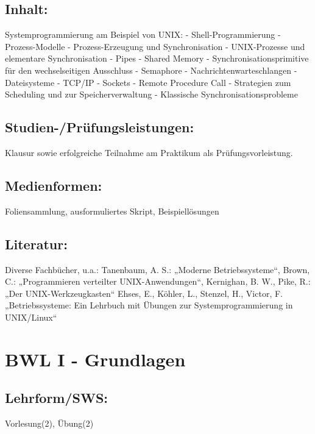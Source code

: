 \section{Inhalt:}\label{inhalt-5}

Systemprogrammierung am Beispiel von UNIX: - Shell-Programmierung -
Prozess-Modelle - Prozess-Erzeugung und Synchronisation - UNIX-Prozesse
und elementare Synchronisation - Pipes - Shared Memory -
Synchronisationsprimitive für den wechselseitigen Ausschluss - Semaphore
- Nachrichtenwarteschlangen - Dateisysteme - TCP/IP - Sockets - Remote
Procedure Call - Strategien zum Scheduling und zur Speicherverwaltung -
Klassische Synchronisationsprobleme

\section{Studien-/Prüfungsleistungen:}\label{studien-pruxfcfungsleistungen-5}

Klausur sowie erfolgreiche Teilnahme am Praktikum als
Prüfungsvorleistung.

\section{Medienformen:}\label{medienformen-5}

Foliensammlung, ausformuliertes Skript, Beispiellösungen

\section{Literatur:}\label{literatur-5}

Diverse Fachbücher, u.a.: Tanenbaum, A. S.: „Moderne Betriebssysteme``,
Brown, C.: „Programmieren verteilter UNIX-Anwendungen``, Kernighan, B.
W., Pike, R.: „Der UNIX-Werkzeugkasten`` Ehses, E., Köhler, L., Stenzel,
H., Victor, F. „Betriebssysteme: Ein Lehrbuch mit Übungen zur
Systemprogrammierung in UNIX/Linux``

\chapter{BWL I - Grundlagen}\label{bwl-i---grundlagen}

\section{Lehrform/SWS:}\label{lehrformsws-6}

Vorlesung(2), Übung(2)

